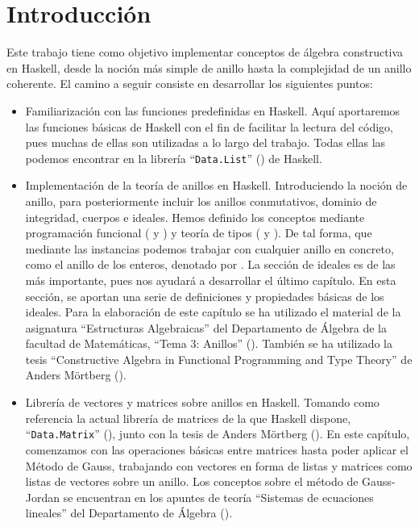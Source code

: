 \label{sec:introHas}
\chapter*{Introducción}

Este trabajo tiene como objetivo implementar conceptos de álgebra constructiva en Haskell, desde la noción más simple de anillo hasta la complejidad de un anillo coherente. El camino a seguir consiste en desarrollar los siguientes puntos:
\begin{itemize}
\item Familiarización con las funciones predefinidas en Haskell. Aquí aportaremos las funciones básicas de Haskell con el fin de facilitar la lectura del código, pues muchas de ellas son utilizadas a lo largo del trabajo. Todas ellas las podemos encontrar en la librería ``\texttt{Data.List}'' (\cite{datalist}) de Haskell.

\item Implementación de la teoría de anillos en Haskell. Introduciendo la noción de anillo, para posteriormente incluir los anillos conmutativos, dominio de integridad, cuerpos e ideales. Hemos definido los conceptos mediante programación funcional (\cite{Alonso-15b} y \cite{Hutton-16}) y teoría de tipos (\cite{Alonso-16a} y \cite{tipos}). De tal forma, que mediante las instancias podemos trabajar con cualquier anillo en concreto, como el anillo de los enteros, denotado por . La sección de ideales es de las más importante, pues nos ayudará a desarrollar el último capítulo. En esta sección, se aportan una serie de definiciones y propiedades básicas de los ideales. Para la elaboración de este capítulo se ha utilizado el material de la asignatura ``Estructuras Algebraicas'' del Departamento de Álgebra de la facultad de Matemáticas, ``Tema 3: Anillos'' (\cite{Algebra-15}). También se ha utilizado la tesis ``Constructive Algebra in Functional Programming and Type Theory'' de Anders Mörtberg (\cite{tesis}).

\item Librería de vectores y matrices sobre anillos en Haskell. Tomando como referencia la actual librería de matrices de la que Haskell dispone, ``\texttt{Data.Matrix}'' (\cite{matrix}), junto con la tesis de Anders Mörtberg (\cite{tesis}). En este capítulo, comenzamos con las operaciones básicas entre matrices hasta poder aplicar el Método de Gauss, trabajando con vectores en forma de listas y matrices como listas de vectores sobre un anillo. Los conceptos sobre el método de Gauss-Jordan se encuentran en los apuntes de teoría ``Sistemas de ecuaciones lineales'' del Departamento de Álgebra (\cite{gauss}).


\end{itemize}
